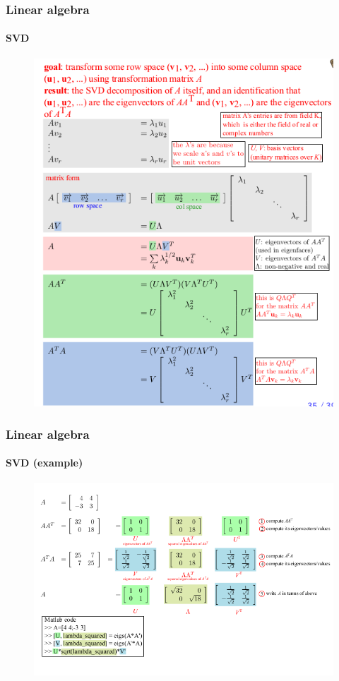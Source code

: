 \documentclass[hyperref={pdfpagelabels=true}]{beamer}
\begin{document}
\begin{frame}
\frametitle{Linear algebra}
\framesubtitle{SVD}
\begin{figure}[!tbp]
\centering
\includegraphics[scale = 0.35,keepaspectratio]{figs/svd.png}
\end{figure}
\end{frame}

\begin{frame}
\frametitle{Linear algebra}
\framesubtitle{SVD (example)}
\begin{figure}[!tbp]
\centering
\includegraphics[scale = 0.4,keepaspectratio]{figs/svd1.png}
\end{figure}
\end{frame}
\end{document}
